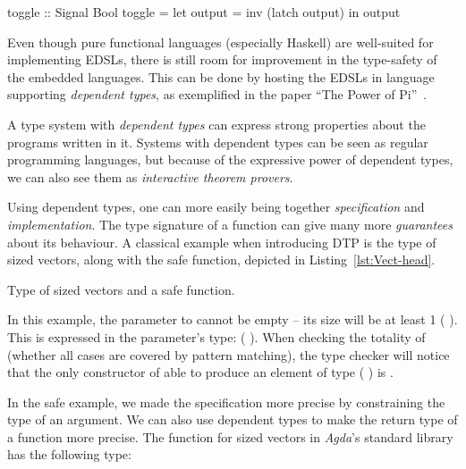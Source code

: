     \begin{haskellcode}
        toggle :: Signal Bool
        toggle = let output = inv (latch output) in output
    \end{haskellcode}

    Even though pure functional languages (especially Haskell) are well-suited for implementing \acp{EDSL},
    there is still room for improvement in the type-safety of the embedded languages.
    This can be done by hosting the \acp{EDSL} in language supporting \emph{dependent types},
    as exemplified in the paper ``The Power of Pi''~\cite{power-pi}.

    A type system with \emph{dependent types} can express strong properties about the programs written in it.
    Systems with dependent types can be seen as regular programming languages,
    but because of the expressive power of dependent types, we can also see them as \emph{interactive theorem provers}.

    Using dependent types, one can more easily being together \emph{specification} and \emph{implementation}.
    The type signature of a function can give many more \emph{guarantees} about its behaviour.
    A classical example when introducing \ac{DTP} is the type of sized vectors,
    along with the safe  function, depicted in Listing~\ref{lst:Vect-head}.

    \begin{listing}[h]
        \caption{Type of sized vectors and a safe  function. \label{lst:Vect-head}}
    \end{listing}

    In this example, the parameter to  cannot be empty -- its size will be at least 1 ( ).
    This is expressed in the parameter's type:   ( ).
    When checking the totality of  (whether all cases are covered by pattern matching),
    the type checker will notice that the only constructor of 
    able to produce an element of type   ( ) is .

    In the safe  example, we made the specification more precise by constraining the type of an argument.
    We can also use dependent types to make the return type of a function more precise.
    The  function for sized vectors in \emph{Agda}'s standard library has the following type:


